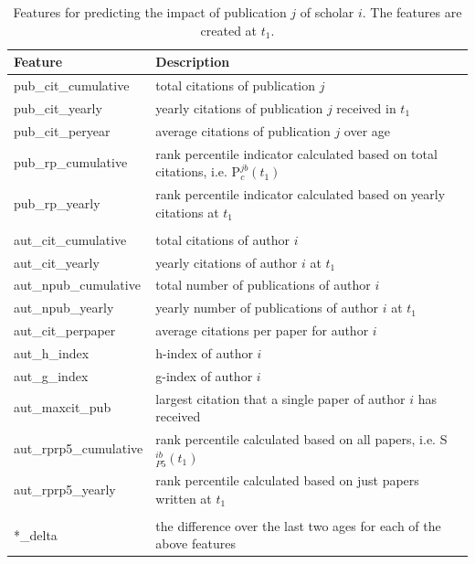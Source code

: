 \begin{refsection}
\begin{table}[htbp]
  \centering
    \begin{tabular}{l|l}
    Feature & Description \\
    \midrule
    pub\_cit\_cumulative & total citations of publication $j$ \\
    pub\_cit\_yearly & yearly citations of publication $j$ received in $t_1$ \\
    pub\_cit\_peryear & average citations of publication $j$ over age \\
    pub\_rp\_cumulative & rank percentile indicator calculated based on total citations, i.e. P$_c^{jb}(t_1)$ \\
    pub\_rp\_yearly & rank percentile indicator calculated based on yearly citations at $t_1$\\
          &  \\
    aut\_cit\_cumulative          & total citations of author $i$ \\
    aut\_cit\_yearly          & yearly citations of author $i$ at $t_1$ \\
    aut\_npub\_cumulative & total number of publications of author $i$ \\
    aut\_npub\_yearly & yearly number of publications of author $i$ at $t_1$ \\
    aut\_cit\_perpaper & average citations per paper for author $i$  \\
    aut\_h\_index & h-index of author $i$  \\
    aut\_g\_index & g-index of author $i$ \\
    aut\_maxcit\_pub & largest citation that a single paper of author $i$ has received \\
    aut\_rprp5\_cumulative & rank percentile calculated based on all papers, i.e. S$_{P5}^{ib}(t_1)$ \\
    aut\_rprp5\_yearly & rank percentile calculated based on just papers written at $t_1$ \\
          &  \\
    *\_delta & the difference over the last two ages for each of the above features \\
    \end{tabular}%
  \caption[Features for predicting the publication impact]{Features for predicting the impact of publication $j$ of scholar $i$. The features are created at $t_1$.}
  \label{tab:features_pubrp}%
\end{table}%


\end{refsection}
